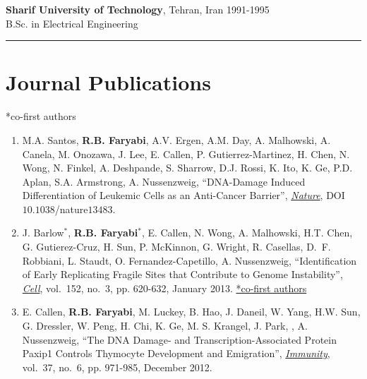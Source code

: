 \documentclass[12pt, centered, centered]{res_yy}
\newenvironment{list1}{
  \begin{list}{\ding{113}}{%
      \setlength{\itemsep}{0in}
      \setlength{\parsep}{0in} \setlength{\parskip}{0in}
      \setlength{\topsep}{0in} \setlength{\partopsep}{0in} 
      \setlength{\leftmargin}{0.17in}}}{\end{list}}
\begin{document}
\begin{resume}
\begin{list1}
\item[] {\bf Sharif University of Technology}, Tehran, Iran \hfill 1991-1995\\
B.Sc. in Electrical Engineering 
\end{list1}

\vspace{-.1in}
\rule{\linewidth}{0.05mm}


\section{\sc Journal Publications}
\vspace{.1in}
*co-first authors
\vspace{.1in}
\begin{enumerate}

\item  M.A. Santos, {\bf {R.B. Faryabi}}, A.V. Ergen, A.M. Day, A. Malhowski, A. Canela, M. Onozawa, J. Lee, E. Callen, P. Gutierrez-Martinez, H. Chen, N. Wong, N. Finkel, A. Deshpande, S. Sharrow, D.J. Rossi, K. Ito, K. Ge, P.D. Aplan, S.A. Armstrong, A. Nussenzweig, ``DNA-Damage Induced Differentiation of Leukemic Cells as an Anti-Cancer Barrier'', \underline{{\emph{Nature}}},  DOI $10.1038$/nature$13483$. 


\item  J. Barlow$^{*}$, {\bf {R.B. Faryabi}}$^{*}$, E. Callen, N. Wong, A. Malhowski, H.T. Chen, G. Gutierez-Cruz, H. Sun, P. McKinnon, G. Wright, R. Casellas, D.~F. Robbiani, L. Staudt, O. Fernandez-Capetillo, A. Nussenzweig, ``Identification of Early Replicating Fragile Sites that Contribute to Genome Instability'', \underline{{\emph{Cell}}},  vol.~152, no.~3, pp. 620-632, January 2013.  \underline{*co-first authors}

\item  E. Callen, {\bf {R.B. Faryabi}}, M. Luckey,  B. Hao,  J. Daneil, W. Yang, H.W. Sun, G. Dressler, W. Peng, H. Chi, K. Ge, M. S. Krangel, J. Park, , A. Nussenzweig, ``The DNA Damage- and Transcription-Associated Protein Paxip1 Controls Thymocyte Development and Emigration'',  \underline{{\emph{Immunity}}}, vol.~37, no.~6, pp. 971-985, December 2012.


\end{enumerate}
\end{resume}
\end{document}
